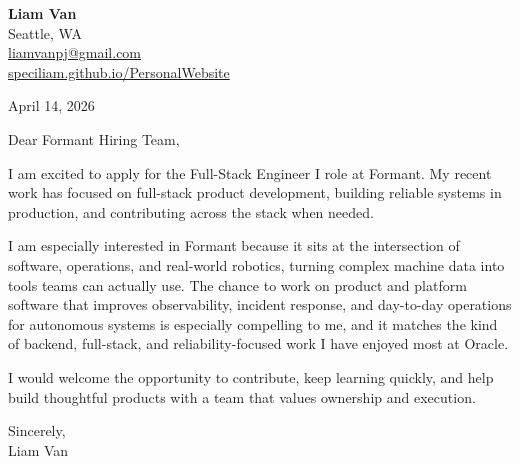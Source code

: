 \documentclass[letterpaper,11pt]{article}
\begin{document}
\begin{flushleft}
\textbf{\Large Liam Van} \\
Seattle, WA \\
\href{mailto:liamvanpj@gmail.com}{liamvanpj@gmail.com} \\
\href{https://speciliam.github.io/PersonalWebsite}{speciliam.github.io/PersonalWebsite}
\end{flushleft}

April 14, 2026

\noindent Dear Formant Hiring Team,

\noindent I am excited to apply for the Full-Stack Engineer I role at Formant. My recent work has focused on full-stack product development, building reliable systems in production, and contributing across the stack when needed.

\noindent I am especially interested in Formant because it sits at the intersection of software, operations, and real-world robotics, turning complex machine data into tools teams can actually use. The chance to work on product and platform software that improves observability, incident response, and day-to-day operations for autonomous systems is especially compelling to me, and it matches the kind of backend, full-stack, and reliability-focused work I have enjoyed most at Oracle.

\noindent I would welcome the opportunity to contribute, keep learning quickly, and help build thoughtful products with a team that values ownership and execution.

\noindent Sincerely, \\
Liam Van
\end{document}
